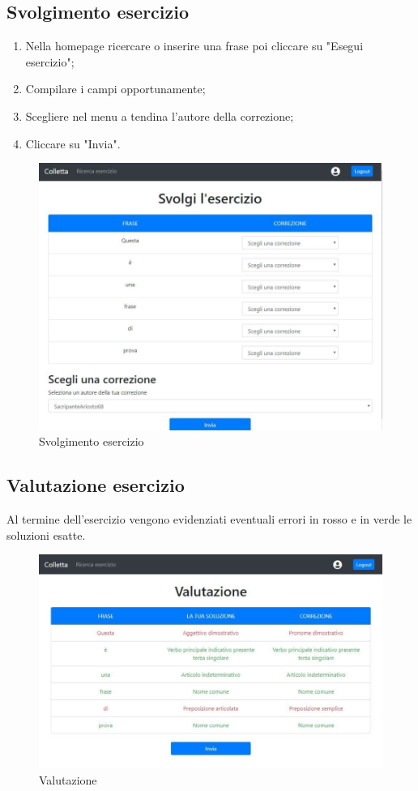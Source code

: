 \documentclass[11pt,a4paper]{article}
\begin{document}
{	\subsection{Svolgimento esercizio}
	\begin{enumerate}
		\item Nella homepage ricercare o inserire una frase poi cliccare su "Esegui esercizio";
		\item Compilare i campi opportunamente;
		\item Scegliere nel menu a tendina l'autore della correzione;
		\item Cliccare su "Invia".
	\end{enumerate}
	\newpage

	\begin{figure}[h]
		\centering
		\includegraphics[scale=0.65]{images/svolgimento.jpg}
		\caption{Svolgimento esercizio}
	\end{figure}
	
	\subsection{Valutazione esercizio}
	Al termine dell'esercizio vengono evidenziati eventuali errori in rosso e in verde le soluzioni esatte.
	\newpage
		\begin{figure}[h!]
		\centering
		\includegraphics[scale=0.65]{images/valutazione.jpg}
		\caption{Valutazione}
	\end{figure}
	
}
\end{document}
